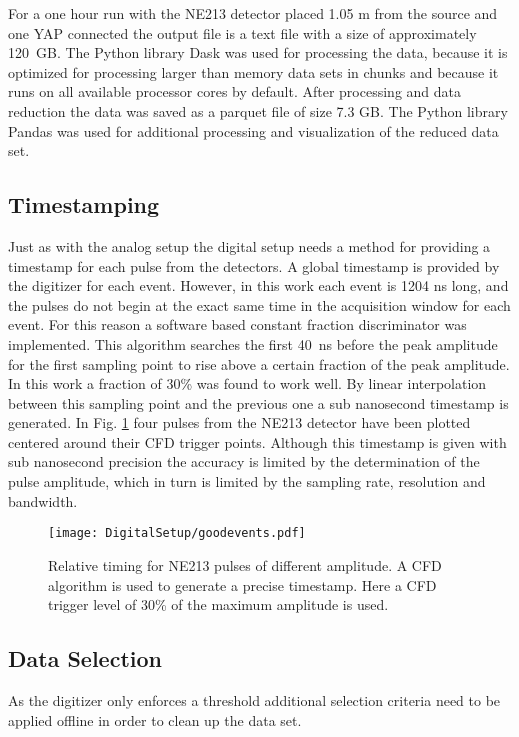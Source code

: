 \documentclass[main.tex]{subfiles}
\begin{document}
For a one hour run with the NE213 detector placed 1.05 m from the source and one YAP connected the output file is a text file with a size of approximately \SI{120}{GB}. The Python library Dask was used for processing the data, because it is optimized for processing larger than memory data sets in chunks and because it runs on all available processor cores by default\cite{Dask}. After processing and data reduction the data was saved as a parquet file of size 7.3 GB. The Python library Pandas was used for additional processing and visualization of the reduced data set\cite{Pandas}.

\subsection{Timestamping}
Just as with the analog setup the digital setup needs a method for providing a timestamp for each pulse from the detectors. A global timestamp is provided by the digitizer for each event. However, in this work each event is 1204 ns long, and the pulses do not begin at the exact same time in the acquisition window for each event. For this reason a software based constant fraction discriminator was implemented. This algorithm searches the first \SI{40}{ns} before the peak amplitude for the first sampling point to rise above  a certain fraction of the peak amplitude. In this work a fraction of 30\% was found to work well. By linear interpolation between this sampling point and the previous one a sub nanosecond timestamp is generated. In Fig. \ref{fig:cfd_trig} four pulses from the NE213 detector have been plotted centered around their CFD trigger points. Although this timestamp is given with sub nanosecond precision the accuracy is limited by the determination of the pulse amplitude, which in turn is limited by the sampling rate, resolution and bandwidth. 

\begin{figure}[ht!]
    \centering
        \texttt{[image: DigitalSetup/goodevents.pdf]}
        \caption[Examples of digitized pulses and their CFD trigger points]{Relative timing for NE213 pulses of different amplitude. A CFD algorithm is used to generate a precise timestamp. Here a CFD trigger level of 30\% of the maximum amplitude is used.}
    \label{fig:cfd_trig} 
\end{figure}

\subsection{Data Selection}
As the digitizer only enforces a threshold additional selection criteria need to be applied offline in order to clean up the data set. 
\end{document}
